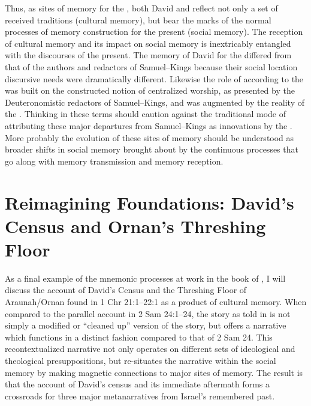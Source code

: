 Thus, as sites of memory for the \chronicler, both David and \thetemple reflect not only a set of received traditions (cultural memory), but bear the marks of the normal processes of memory construction for the present (social memory). The reception of cultural memory and its impact on social memory is inextricably entangled with the discourses of the present. The memory of David for the \chronicler differed from that of the authors and redactors of Samuel--Kings because their social location discursive needs were dramatically different. Likewise the role of \thetemple according to the \chronicler was built on the constructed notion of centralized worship, as presented by the Deuteronomistic redactors of Samuel--Kings, and was augmented by the reality of the \secondtemple. Thinking in these terms should caution against the traditional mode of attributing these major departures from Samuel--Kings as innovations by the \chronicler. More probably the evolution of these sites of memory should be understood as broader shifts in social memory brought about by the continuous processes that go along with memory transmission and memory reception. 

\section{Reimagining Foundations: David's Census and Ornan's Threshing Floor}

As a final example of the mnemonic processes at work in the book of \chronicles, I will discuss the account of David's Census and the Threshing Floor of Araunah/Ornan found in 1 Chr 21:1--22:1 as a product of cultural memory. When compared to the parallel account in 2 Sam 24:1--24, the story as told in \chronicles is not simply a modified or ``cleaned up'' version of the story, but offers a narrative which functions in a distinct fashion compared to that of 2 Sam 24. This recontextualized narrative not only operates on different sets of ideological and theological presuppositions, but re-situates the narrative within the social memory by making magnetic connections to major sites of memory. The result is that the account of David's census and its immediate aftermath forms a crossroads for three major metanarratives from Israel's remembered past.

